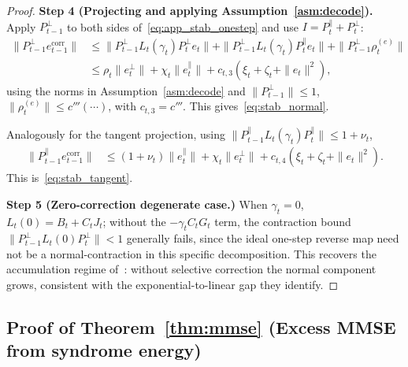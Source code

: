 \documentclass{article}
\theoremstyle{plain}
\theoremstyle{definition}
\theoremstyle{remark}
\begin{document}
\begin{proof}
\textbf{Step 4 (Projecting and applying Assumption~\ref{asm:decode}).}
Apply \(P_{t-1}^\perp\) to both sides of~\eqref{eq:app_stab_onestep} and
use \(I = P_t^\parallel + P_t^\perp\):
\begin{align*}
\|P_{t-1}^\perp e_{t-1}^{\mathrm{corr}}\|
&\le \|P_{t-1}^\perp L_t(\gamma_t) P_t^\perp e_t\|
   + \|P_{t-1}^\perp L_t(\gamma_t) P_t^\parallel e_t\|
   + \|P_{t-1}^\perp \rho_t^{(e)}\| \\
&\le \rho_t \|e_t^\perp\| + \chi_t \|e_t^\parallel\|
   + c_{t,3}(\xi_t + \zeta_t + \|e_t\|^2),
\end{align*}
using the norms in Assumption~\ref{asm:decode} and
\(\|P_{t-1}^\perp\| \le 1\), \(\|\rho_t^{(e)}\| \le c'''(\cdots)\), with
\(c_{t,3} = c'''\). This gives~\eqref{eq:stab_normal}.

Analogously for the tangent projection, using
\(\|P_{t-1}^\parallel L_t(\gamma_t) P_t^\parallel\| \le 1+\nu_t\),
\begin{align*}
\|P_{t-1}^\parallel e_{t-1}^{\mathrm{corr}}\|
&\le (1+\nu_t)\|e_t^\parallel\| + \chi_t \|e_t^\perp\|
   + c_{t,4}(\xi_t + \zeta_t + \|e_t\|^2).
\end{align*}
This is~\eqref{eq:stab_tangent}.

\textbf{Step 5 (Zero-correction degenerate case.)}
When \(\gamma_t = 0\), \(L_t(0) = B_t + C_t J_t\); without the
\(-\gamma_t C_t G_t\) term, the contraction bound
\(\|P_{t-1}^\perp L_t(0) P_t^\perp\|<1\) generally fails, since the ideal
one-step reverse map need not be a normal-contraction in this specific
decomposition. This recovers the accumulation regime
of~\citet{zhong2026iec}: without selective correction the normal component
grows, consistent with the exponential-to-linear gap they identify.
\end{proof}

\subsection{Proof of Theorem~\ref{thm:mmse} (Excess MMSE from syndrome energy)}
\label{app:thm_mmse}
\end{document}
